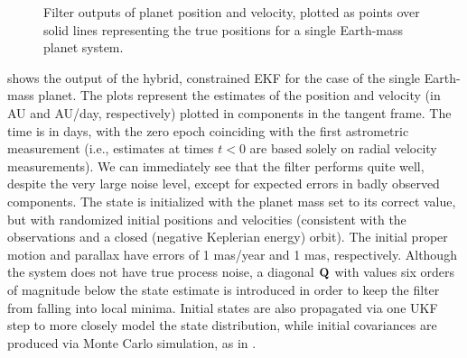 \begin{figure}[ht]
 \begin{center}
 \end{center}
 \caption[Filtered results for Earth mass planet]{ \label{fig:true_mass_rv}
	Filter outputs of planet position and velocity, plotted as points over solid lines representing the true positions for a single Earth-mass planet system.}
\end{figure}
 shows the output of the hybrid, constrained EKF for the case of the single Earth-mass planet.  The plots represent the estimates of the position and velocity (in AU and AU/day, respectively) plotted in components in the tangent frame.  The time is in days, with the zero epoch coinciding with the first astrometric measurement (i.e., estimates at times $t < 0$ are based solely on radial velocity measurements). We can immediately see that the filter performs quite well, despite the very large noise level, except for expected errors in badly observed components.  The state is initialized with the planet mass set to its correct value, but with randomized initial positions and velocities (consistent with the observations and a closed (negative Keplerian energy) orbit).  The initial proper motion and parallax have errors of 1 mas/year and 1 mas, respectively.  Although the system does not have true process noise, a diagonal $\mathbf Q$ with values six orders of magnitude below the state estimate is introduced in order to keep the filter from falling into local minima.  Initial states are also propagated via one UKF step to more closely model the state distribution, while initial covariances are produced via Monte Carlo simulation, as in .

